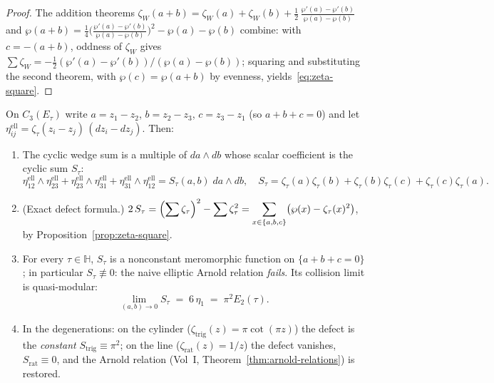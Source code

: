 \begin{proof}
The addition theorems
$\zeta_W(a{+}b) = \zeta_W(a) + \zeta_W(b) +
\tfrac{1}{2}\,\frac{\wp'(a)-\wp'(b)}{\wp(a)-\wp(b)}$
and
$\wp(a{+}b) = \tfrac{1}{4}\bigl(\frac{\wp'(a)-\wp'(b)}
{\wp(a)-\wp(b)}\bigr)^2 - \wp(a) - \wp(b)$
combine: with $c = -(a{+}b)$, oddness of $\zeta_W$ gives
$\sum\zeta_W = -\tfrac{1}{2}(\wp'(a)-\wp'(b))/(\wp(a)-\wp(b))$;
squaring and substituting the second theorem, with
$\wp(c) = \wp(a{+}b)$ by evenness, yields~\eqref{eq:zeta-square}.
\end{proof}

\begin{theorem}
\label{thm:elliptic-arnold-fails}
On $C_3(E_\tau)$ write $a = z_1 - z_2$, $b = z_2 - z_3$,
$c = z_3 - z_1$ (so $a + b + c = 0$) and let
$\eta_{ij}^{\mathrm{ell}} = \zeta_\tau(z_i - z_j)\,(dz_i - dz_j)$.
Then:
\begin{enumerate}[label=\textup{(\roman*)}]
\item The cyclic wedge sum is a multiple of $da \wedge db$ whose
scalar coefficient is the cyclic sum $S_\tau$:
\[
\eta_{12}^{\mathrm{ell}} \wedge \eta_{23}^{\mathrm{ell}}
+ \eta_{23}^{\mathrm{ell}} \wedge \eta_{31}^{\mathrm{ell}}
+ \eta_{31}^{\mathrm{ell}} \wedge \eta_{12}^{\mathrm{ell}}
= S_\tau(a,b)\; da \wedge db,
\quad
S_\tau = \zeta_\tau(a)\zeta_\tau(b) + \zeta_\tau(b)\zeta_\tau(c)
+ \zeta_\tau(c)\zeta_\tau(a).
\]
\item \textup{(}Exact defect formula.\textup{)}
$\displaystyle
2\,S_\tau
= \Bigl(\sum \zeta_\tau\Bigr)^{2} - \sum \zeta_\tau^{2}
= \sum_{x \in \{a,b,c\}} \bigl(\wp(x) - \zeta_\tau(x)^2\bigr)$,
by Proposition~\ref{prop:zeta-square}.
\item For every $\tau \in \mathbb{H}$, $S_\tau$ is a nonconstant
meromorphic function on $\{a+b+c=0\}$; in particular
$S_\tau \not\equiv 0$: the naive elliptic Arnold relation
\emph{fails}. Its collision limit is quasi-modular:
\[
\lim_{(a,b)\to 0} S_\tau \;=\; 6\,\eta_1 \;=\; \pi^2 E_2(\tau).
\]
\item In the degenerations: on the cylinder
($\zeta_{\mathrm{trig}}(z) = \pi\cot(\pi z)$) the defect is the
\emph{constant} $S_{\mathrm{trig}} \equiv \pi^2$; on the line
($\zeta_{\mathrm{rat}}(z) = 1/z$) the defect vanishes,
$S_{\mathrm{rat}} \equiv 0$, and the Arnold relation
(Vol~I, Theorem~\ref{thm:arnold-relations}) is restored.
\end{enumerate}
\end{theorem}

